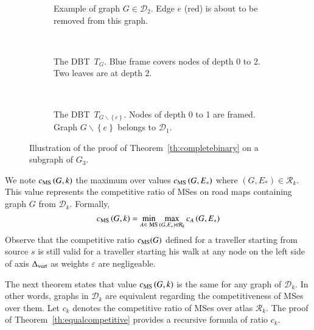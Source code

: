 \documentclass[preprint]{elsarticle}
\newcommand{\set}[1]{\left\{ #1 \right\}}
\newcommand{\mcalr}{\mathcal{R}}
\newcommand{\mcald}{\mathcal{D}}
\newcommand{\mts}{MS}
\newcommand{\deltavert}{\Delta_{\mbox{\scriptsize{vert}}}}
\newcommand{\cms}{c_{\mbox{\scriptsize{MS}}}}
\newcommand{\ebt}{DBT}
\begin{document}
\begin{figure}[h]
\centering
\begin{subfigure}[b]{0.3\columnwidth}
\centering
\scalebox{.40}{}
\caption{Example of graph $G \in \mcald_2$. Edge $e$ (red) is about to be removed from this graph.}
\label{subfig:proofth1_a}
\end{subfigure}
~
\begin{subfigure}[b]{0.3\columnwidth}
\centering
\scalebox{.55}{}
\caption{The \ebt ~$T_{G}$. Blue frame covers nodes of depth 0 to 2. Two leaves are at depth 2.}
\label{subfig:proofth1_b}
\end{subfigure}
~
\begin{subfigure}[b]{0.3\columnwidth}
\centering
\scalebox{.55}{}
\caption{The \ebt ~$T_{G \backslash \set{e}}$. Nodes of depth 0 to 1 are framed. Graph $G\backslash \set{e}$ belongs to $\mcald_1$.}
\label{subfig:proofth1_c}
\end{subfigure}
\caption{Illustration of the proof of Theorem~\ref{th:completebinary} on a subgraph of $G_3$.}
\label{fig:proofth1}
\end{figure}


We note $\cms\left(G, k\right)$ the maximum over values $\cms\left(G,E_*\right)$ where $\left(G,E_*\right) \in \mcalr_k$. This value represents the competitive ratio of \mts es on road maps containing graph $G$ from $\mcald_k$. Formally, 
\begin{equation}
\cms\left(G, k\right) = \min\limits_{A \in ~\mbox{\scriptsize {MS}}} \max\limits_{\left(G,E_*\right) \in \mcalr_k} c_A\left(G,E_*\right)
\label{eq:cmsg}
\end{equation}
Observe that the competitive ratio $\cms(G)$ defined for a traveller starting from source $s$ is still valid for a traveller starting his walk at any node on the left side of axis $\deltavert$ as weights $\varepsilon$ are negligeable. 

The next theorem states that value $\cms\left(G, k\right)$ is the same for any graph of $\mcald_k$. In other words, graphs in $\mcald_k$ are equivalent regarding the competitiveness of \mts es over them. Let $c_k$ denotes the competitive ratio of \mts es over atlas $\mcalr_k$. The proof of Theorem~\ref{th:equalcompetitive} provides a recursive formula of ratio $c_k$.
\end{document}

